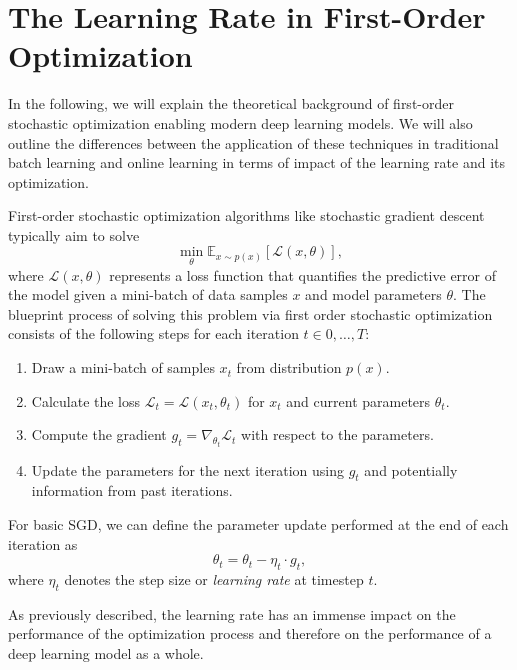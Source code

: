 \documentclass[letterpaper]{article} %
\begin{document}
\section{The Learning Rate in First-Order Optimization}

In the following, we will explain the theoretical background of first-order stochastic optimization enabling modern deep learning models.
We will also outline the differences between the application of these techniques in traditional batch learning and online learning in terms of impact of the learning rate and its optimization.

First-order stochastic optimization algorithms like stochastic gradient descent typically aim to solve
\begin{equation}
	\min_{\theta} \mathbb{E}_{x \sim p(x)} [\mathcal{L}(x, \theta)],
\end{equation}
where $\mathcal{L}(x, \theta)$ represents a loss function that quantifies the predictive error of the model given a mini-batch of data samples $x$ and model parameters $\theta$.
The blueprint process of solving this problem via first order stochastic optimization consists of the following steps for each iteration $t \in 0, \ldots, T$:
\begin{enumerate}
	\item Draw a mini-batch of samples $x_t$ from distribution $p(x)$.
	\item Calculate the loss $\mathcal{L}_t = \mathcal{L}(x_t, \theta_t)$ for $x_t$ and current parameters $\theta_t$.
	\item Compute the gradient $g_t = \nabla_{\theta_t} \mathcal{L}_t$ with respect to the parameters.
	\item Update the parameters for the next iteration using $g_t$ and potentially information from past iterations.
\end{enumerate}

For basic SGD, we can define the parameter update performed at the end of each iteration as
\begin{equation}
	\theta_{t}  = \theta_{t} - \eta_t \cdot g_t,
\end{equation}
where $\eta_t$ denotes the step size or \textit{learning rate} at timestep $t$.

As previously described, the learning rate has an immense impact on the performance of the optimization process and therefore on the performance of a deep learning model as a whole.
\end{document}
